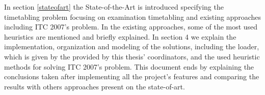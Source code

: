 In section \ref{stateofart} the State-of-the-Art is introduced specifying the timetabling problem focusing on examination timetabling and existing approaches including ITC 2007's problem. In the existing approaches, some of the most used heuristics are mentioned and briefly explained. In section 4 we explain the implementation, organization and modeling of the solutions, including the loader, which is given by the provided by this thesis' coordinators, and the used heuristic methods for solving ITC 2007's problem. This document ends by explaining the conclusions taken after implementing all the project's features and comparing the results with others approaches present on the state-of-art.